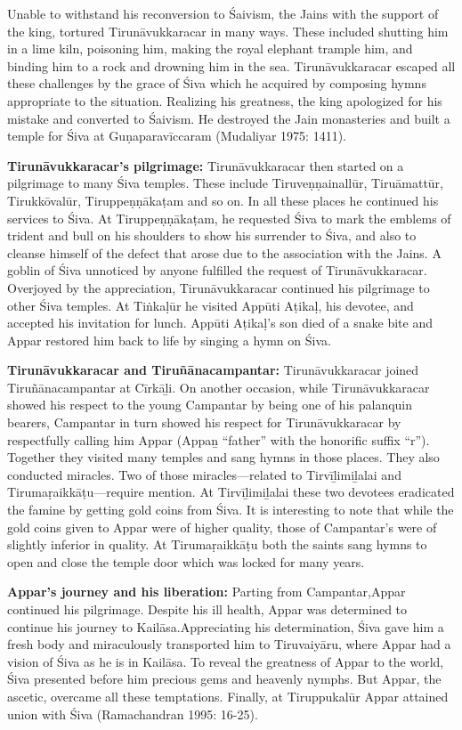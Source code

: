 Unable to withstand his reconversion to Śaivism, the Jains with the support of the king, tortured Tirunāvukkaracar in many ways. These included shutting him in a lime kiln, poisoning him, making the royal elephant trample him, and binding him to a rock and drowning him in the sea. Tirunāvukkaracar escaped all these challenges by the grace of Śiva which he acquired by composing hymns appropriate to the situation. Realizing his greatness, the king apologized for his mistake and converted to Śaivism. He destroyed the Jain monasteries and built a temple for Śiva at Guṇaparavīccaram (Mudaliyar 1975: 1411).

\textbf{Tirunāvukkaracar’s pilgrimage:} Tirunāvukkaracar then started on a pilgrimage to many Śiva temples. These include Tiruveṇṇainallūr, Tiruāmattūr, Tirukkōvalūr, Tiruppeṇṇākaṭam and so on. In all these places he continued his services to Śiva. At Tiruppeṇṇākaṭam, he requested Śiva to mark the emblems of trident and bull on his shoulders to show his surrender to Śiva, and also to cleanse himself of the defect that arose due to the association with the Jains. A goblin of Śiva unnoticed by anyone fulfilled the request of Tirunāvukkaracar. Overjoyed by the appreciation, Tirunāvukkaracar continued his pilgrimage to other Śiva temples. At Tiṅkaḷūr he visited Appūti Aṭikaḷ, his devotee, and accepted his invitation for lunch. Appūti Aṭikaḷ’s son died of a snake bite and Appar restored him back to life by singing a hymn on Śiva.

\textbf{Tirunāvukkaracar and Tiruñānacampantar:} Tirunāvukkaracar joined Tiruñānacampantar at Cīrkāḻi. On another occasion, while Tirunāvukkaracar showed his respect to the young Campantar by being one of his palanquin bearers, Campantar in turn showed his respect for Tirunāvukkaracar by respectfully calling him Appar (Appaṉ “father” with the honorific suffix “r”). Together they visited many temples and sang hymns in those places. They also conducted miracles. Two of those miracles—related to Tirvīḻimiḻalai and Tirumaṛaikkāṭu—require mention. At Tirvīḻimiḻalai these two devotees eradicated the famine by getting gold coins from Śiva. It is interesting to note that while the gold coins given to Appar were of higher quality, those of Campantar’s were of slightly inferior in quality. At Tirumaṛaikkāṭu both the saints sang hymns to open and close the temple door which was locked for many years.

\textbf{Appar’s journey and his liberation:} Parting from Campantar,Appar continued his pilgrimage. Despite his ill health, Appar was determined to continue his journey to Kailāsa.Appreciating his determination, Śiva gave him a fresh body and miraculously transported him to Tiruvaiyāru, where Appar had a vision of Śiva as he is in Kailāsa. To reveal the greatness of Appar to the world, Śiva presented before him precious gems and heavenly nymphs. But Appar, the ascetic, overcame all these temptations. Finally, at Tiruppukalūr Appar attained union with Śiva (Ramachandran 1995: 16-25).

